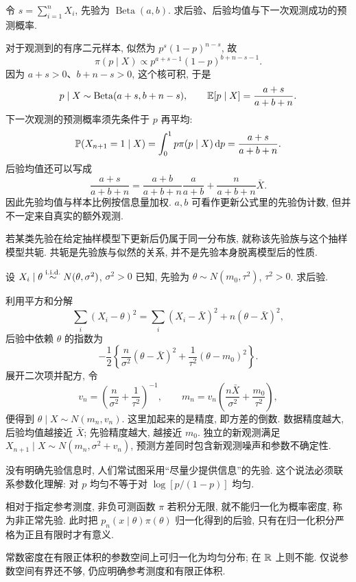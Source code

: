 \begin{example}
令 $s=\sum_{i=1}^n X_i$, 先验为 $\operatorname{Beta}(a,b)$. 求后验、后验均值与下一次观测成功的预测概率. 
\end{example}
\begin{solution}
对于观测到的有序二元样本, 似然为 $p^s(1-p)^{n-s}$, 故
\[
 \pi(p\mid X)\propto p^{a+s-1}(1-p)^{b+n-s-1}.
\]
因为 $a+s>0$、$b+n-s>0$, 这个核可积, 于是
\[
 p\mid X\sim\operatorname{Beta}(a+s,b+n-s),\qquad
 \mathbb E[p\mid X]=\frac{a+s}{a+b+n}.
\]
下一次观测的预测概率须先条件于 $p$ 再平均: 
\[
 \mathbb P(X_{n+1}=1\mid X)=\int_0^1 p\pi(p\mid X)\,\mathrm d p
 =\frac{a+s}{a+b+n}.
\]
后验均值还可以写成
\[
 \frac{a+s}{a+b+n}=\frac{a+b}{a+b+n}\frac{a}{a+b}
                    +\frac{n}{a+b+n}\bar X.
\]
因此先验均值与样本比例按信息量加权. $a,b$ 可看作更新公式里的先验伪计数, 但并不一定来自真实的额外观测. 
\end{solution}
\begin{definition}[共轭先验]
若某类先验在给定抽样模型下更新后仍属于同一分布族, 就称该先验族与这个抽样模型共轭. 共轭是先验族与似然的关系, 并不是先验本身脱离模型后的性质. 
\end{definition}

\begin{example}
设 $X_i\mid\theta\stackrel{\mathrm{i.i.d.}}{\sim} N(\theta,\sigma^2)$, $\sigma^2>0$ 已知, 先验为 $\theta\sim N(m_0,\tau^2)$, $\tau^2>0$. 求后验. 
\end{example}
\begin{solution}
利用平方和分解
\[
 \sum_i(X_i-\theta)^2=\sum_i(X_i-\bar X)^2+n(\theta-\bar X)^2,
\]
后验中依赖 $\theta$ 的指数为
\[
 -\frac12\left\{\frac{n}{\sigma^2}(\theta-\bar X)^2
                  +\frac1{\tau^2}(\theta-m_0)^2\right\}.
\]
展开二次项并配方, 令
\[
 v_n=\left(\frac n{\sigma^2}+\frac1{\tau^2}\right)^{-1},\qquad
 m_n=v_n\left(\frac{n\bar X}{\sigma^2}+\frac{m_0}{\tau^2}\right),
\]
便得到 $\theta\mid X\sim N(m_n,v_n)$. 这里加起来的是精度, 即方差的倒数. 数据精度越大, 后验均值越接近 $\bar X$; 先验精度越大, 越接近 $m_0$. 独立的新观测满足 $X_{n+1}\mid X\sim N(m_n,\sigma^2+v_n)$, 预测方差同时包含新观测噪声和参数不确定性. 
\end{solution}

没有明确先验信息时, 人们常试图采用“尽量少提供信息”的先验. 这个说法必须联系参数化理解: 对 $p$ 均匀不等于对 $\log[p/(1-p)]$ 均匀. 

\begin{definition}[非正常先验]
相对于指定参考测度, 非负可测函数 $\pi$ 若积分无限, 就不能归一化为概率密度, 称为非正常先验. 此时把 $p_n(x\mid\theta)\pi(\theta)$ 归一化得到的后验, 只有在归一化积分严格为正且有限时才有意义. 
\end{definition}
常数密度在有限正体积的参数空间上可归一化为均匀分布; 在 $\mathbb R$ 上则不能. 仅说参数空间有界还不够, 仍应明确参考测度和有限正体积. 

